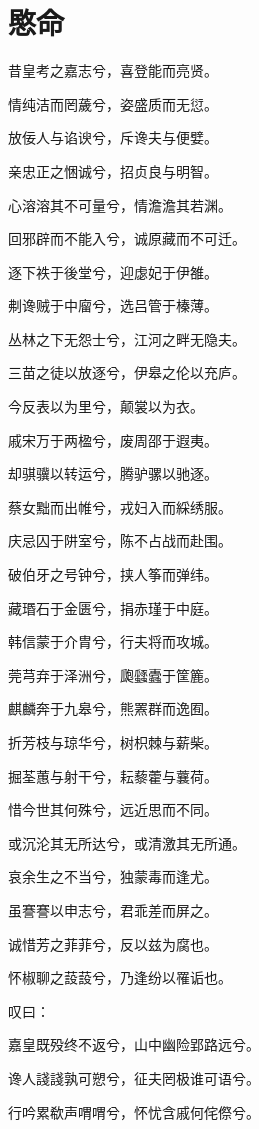 \documentclass[UTF8,titlepage,oneside]{ctexbook}
\begin{document}
\section*{愍命}
\begin{center}
	
	昔皇考之嘉志兮，喜登能而亮贤。
	
	情纯洁而罔薉兮，姿盛质而无愆。
	
	放佞人与谄谀兮，斥谗夫与便嬖。
	
	亲忠正之悃诚兮，招贞良与明智。
	
	心溶溶其不可量兮，情澹澹其若渊。
	
	回邪辟而不能入兮，诚原藏而不可迁。
	
	逐下袟于後堂兮，迎虙妃于伊雒。
	
	刜谗贼于中廇兮，选吕管于榛薄。
	
	丛林之下无怨士兮，江河之畔无隐夫。
	
	三苗之徒以放逐兮，伊皋之伦以充庐。
	
	今反表以为里兮，颠裳以为衣。
	
	戚宋万于两楹兮，废周邵于遐夷。
	
	却骐骥以转运兮，腾驴骡以驰逐。
	
	蔡女黜而出帷兮，戎妇入而綵绣服。
	
	庆忌囚于阱室兮，陈不占战而赴围。
	
	破伯牙之号钟兮，挟人筝而弹纬。
	
	藏瑉石于金匮兮，捐赤瑾于中庭。
	
	韩信蒙于介胄兮，行夫将而攻城。
	
	莞芎弃于泽洲兮，瓟瓥蠹于筐簏。
	
	麒麟奔于九皋兮，熊罴群而逸囿。
	
	折芳枝与琼华兮，树枳棘与薪柴。
	
	掘荃蕙与射干兮，耘藜藿与蘘荷。
	
	惜今世其何殊兮，远近思而不同。
	
	或沉沦其无所达兮，或清激其无所通。
	
	哀余生之不当兮，独蒙毒而逢尤。
	
	虽謇謇以申志兮，君乖差而屏之。
	
	诚惜芳之菲菲兮，反以兹为腐也。
	
	怀椒聊之蔎蔎兮，乃逢纷以罹诟也。
	
	叹曰：
	
	嘉皇既殁终不返兮，山中幽险郢路远兮。
	
	谗人諓諓孰可愬兮，征夫罔极谁可语兮。
	
	行吟累欷声喟喟兮，怀忧含戚何侘傺兮。
	
	
\end{center}
\end{document}
